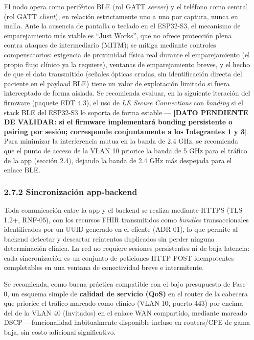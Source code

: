 \documentclass[11pt,a4paper]{article}
\begin{document}
El nodo opera como periférico BLE (rol GATT \emph{server}) y el teléfono como central (rol GATT \emph{client}), en relación estrictamente uno a uno por captura, nunca en malla. Ante la ausencia de pantalla o teclado en el ESP32-S3, el mecanismo de emparejamiento más viable es ``Just Works'', que no ofrece protección plena contra ataques de intermediario (MITM); se mitiga mediante controles compensatorios: exigencia de proximidad física real durante el emparejamiento (el propio flujo clínico ya la requiere), ventanas de emparejamiento breves, y el hecho de que el dato transmitido (señales ópticas crudas, sin identificación directa del paciente en el payload BLE) tiene un valor de explotación limitado si fuera interceptado de forma aislada. Se recomienda evaluar, en la siguiente iteración del firmware (paquete EDT 4.3), el uso de \emph{LE Secure Connections} con \emph{bonding} si el stack BLE del ESP32-S3 lo soporta de forma estable --- \textbf{{[}DATO PENDIENTE DE VALIDAR: si el firmware implementará bonding persistente o pairing por sesión; corresponde conjuntamente a los Integrantes 1 y 3{]}}. Para minimizar la interferencia mutua en la banda de 2.4 GHz, se recomienda que el punto de acceso de la VLAN 10 priorice la banda de 5 GHz para el tráfico de la app (sección 2.4), dejando la banda de 2.4 GHz más despejada para el enlace BLE.

\subsubsection{2.7.2 Sincronización app-backend}\label{sincronizaciuxf3n-app-backend}

Toda comunicación entre la app y el backend se realiza mediante HTTPS (TLS 1.2+, RNF-05), con los recursos FHIR transmitidos como \emph{bundles} transaccionales identificados por un UUID generado en el cliente (ADR-01), lo que permite al backend detectar y descartar reintentos duplicados sin perder ninguna determinación clínica. La red no requiere sesiones persistentes ni de baja latencia: cada sincronización es un conjunto de peticiones HTTP POST idempotentes completables en una ventana de conectividad breve e intermitente.

Se recomienda, como buena práctica compatible con el bajo presupuesto de Fase 0, un esquema simple de \textbf{calidad de servicio (QoS)} en el router de la cabecera que priorice el tráfico marcado como clínico (VLAN 10, puerto 443) por encima del de la VLAN 40 (Invitados) en el enlace WAN compartido, mediante marcado DSCP ---funcionalidad habitualmente disponible incluso en routers/CPE de gama baja, sin costo adicional significativo.
\end{document}
